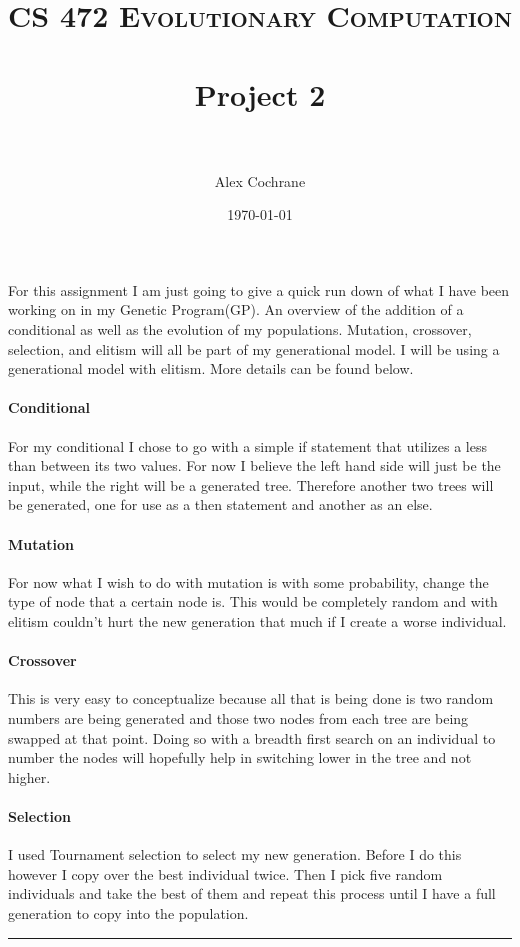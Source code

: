 \documentclass[paper=a4, fontsize=11pt]{scrartcl} %
\title{	
\normalfont \normalsize 
\textsc{CS 472 Evolutionary Computation} \\ [25pt] %
\horrule{0.5pt} \\[0.4cm] %
\huge Project 2 \\ %
\horrule{2pt} \\[0.5cm] %
}
\author{Alex Cochrane} %
\date{\normalsize\today} %
\numberwithin{equation}{section} %
\numberwithin{figure}{section} %
\numberwithin{table}{section} %
\newcommand{\horrule}[1]{\rule{\linewidth}{#1}} %
\begin{document}
\maketitle %


\paragraph{} For this assignment I am just going to give  a quick run down of what I have been working on in my Genetic Program(GP). An overview of the addition of a conditional as well as the evolution of my populations. Mutation, crossover, selection, and elitism will all be part of my generational model. I will be using a generational model with elitism. More details can be found below.

\paragraph{Conditional} For my conditional I chose to go with a simple if statement that utilizes a less than between its two values. For now I believe the left hand side will just be the input, while the right will be a generated tree. Therefore another two trees will be generated, one for use as a then statement and another as an else.

\paragraph{Mutation} For now what I wish to do with mutation is with some probability, change the type of node that a certain node is. This would be completely random and with elitism couldn't hurt the new generation that much if I create a worse individual.

\paragraph{Crossover} This is very easy to conceptualize because all that is being done is two random numbers are being generated and those two nodes from each tree are being swapped at that point. Doing so with a breadth first search on an individual to number the nodes will hopefully help in switching lower in the tree and not higher.

\paragraph{Selection} I used Tournament selection to select my new generation. Before I do this however I copy over the best individual twice. Then I pick five random individuals and take the best of them and repeat this process until I have a full generation to copy into the population.


\horrule{0.5pt} \\[0.4cm] %
\end{document}
